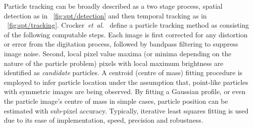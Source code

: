 Particle tracking can be broadly described as a two stage process, spatial detection as in \figurename~\ref{fig:spt/detection} and then temporal tracking as in \figurename~\ref{fig:spt/tracking}.
Crocker~\emph{et~al.}~\cite{Crocker1996} define a particle tracking method as consisting of the following computable steps.
Each image is first
corrected for any distortion or error from the digitation process, followed by bandpass filtering to suppress image noise. %
Second, local pixel value maxima (or minima depending on the nature of the particle problem) pixels with local maximum brightness are identified as \emph{candidate} particles.
A centroid (centre of mass) fitting procedure is employed to infer particle location under the assumption that, %
point-like particles with symmetric images are being observed.
By fitting a Gaussian profile, or even the particle image's centre of mass in simple cases, %
particle position can be estimated with sub-pixel accuracy.
Typically, iterative least squares fitting is used %
due to its ease of implementation, speed, precision and robustness.%
%
